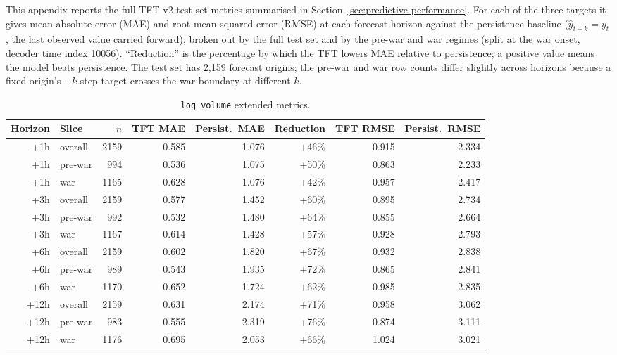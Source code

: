 This appendix reports the full TFT v2 test-set metrics summarised in Section~\ref{sec:predictive-performance}. For each of the three targets it gives mean absolute error (MAE) and root mean squared error (RMSE) at each forecast horizon against the persistence baseline ($\hat{y}_{t+k} = y_t$, the last observed value carried forward), broken out by the full test set and by the pre-war and war regimes (split at the war onset, decoder time index 10056). ``Reduction'' is the percentage by which the TFT lowers MAE relative to persistence; a positive value means the model beats persistence. The test set has 2{,}159 forecast origins; the pre-war and war row counts differ slightly across horizons because a fixed origin's $+k$-step target crosses the war boundary at different $k$.

\begin{table}[h]
  \centering
  \small
  \caption{\texttt{log\_volume} extended metrics.}
  \label{tab:metrics-logvolume}
  \begin{tabular}{@{}rlrrrrrr@{}}
    \toprule
    Horizon & Slice & $n$ & TFT MAE & Persist.\ MAE & Reduction & TFT RMSE & Persist.\ RMSE \\
    \midrule
    +1h & overall & 2159 & 0.585 & 1.076 & +46\% & 0.915 & 2.334 \\
    +1h & pre-war & 994 & 0.536 & 1.075 & +50\% & 0.863 & 2.233 \\
    +1h & war & 1165 & 0.628 & 1.076 & +42\% & 0.957 & 2.417 \\
    +3h & overall & 2159 & 0.577 & 1.452 & +60\% & 0.895 & 2.734 \\
    +3h & pre-war & 992 & 0.532 & 1.480 & +64\% & 0.855 & 2.664 \\
    +3h & war & 1167 & 0.614 & 1.428 & +57\% & 0.928 & 2.793 \\
    +6h & overall & 2159 & 0.602 & 1.820 & +67\% & 0.932 & 2.838 \\
    +6h & pre-war & 989 & 0.543 & 1.935 & +72\% & 0.865 & 2.841 \\
    +6h & war & 1170 & 0.652 & 1.724 & +62\% & 0.985 & 2.835 \\
    +12h & overall & 2159 & 0.631 & 2.174 & +71\% & 0.958 & 3.062 \\
    +12h & pre-war & 983 & 0.555 & 2.319 & +76\% & 0.874 & 3.111 \\
    +12h & war & 1176 & 0.695 & 2.053 & +66\% & 1.024 & 3.021 \\
    \bottomrule
  \end{tabular}
\end{table}

